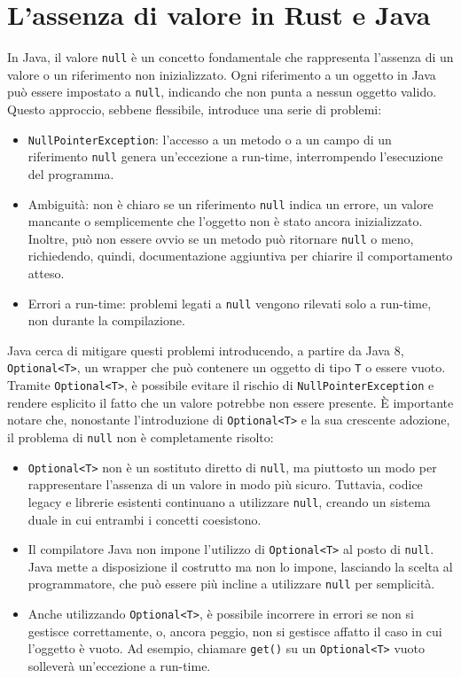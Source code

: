 \section{L'assenza di valore in Rust e Java}
In Java, il valore \texttt{null} è un concetto fondamentale che rappresenta l'assenza di un valore o un riferimento non inizializzato. Ogni riferimento a un oggetto in Java può essere impostato a \texttt{null}, indicando che non punta a nessun oggetto valido. Questo approccio, sebbene flessibile, introduce una serie di problemi: 
\begin{itemize}
    \item \texttt{NullPointerException}: l'accesso a un metodo o a un campo di un riferimento \texttt{null} genera un'eccezione a run-time, interrompendo l'esecuzione del programma. 
    \item Ambiguità: non è chiaro se un riferimento \texttt{null} indica un errore, un valore mancante o semplicemente che l'oggetto non è stato ancora inizializzato. Inoltre, può non essere ovvio se un metodo può ritornare \texttt{null} o meno, richiedendo, quindi, documentazione aggiuntiva per chiarire il comportamento atteso.
    \item Errori a run-time: problemi legati a \texttt{null} vengono rilevati solo a run-time, non durante la compilazione. 
\end{itemize}
Java cerca di mitigare questi problemi introducendo, a partire da Java 8, \texttt{Optional<T>}, un wrapper che può contenere un oggetto di tipo \texttt{T} o essere vuoto. Tramite \texttt{Optional<T>}, è possibile evitare il rischio di \texttt{NullPointerException} e rendere esplicito il fatto che un valore potrebbe non essere presente. È importante notare che, nonostante l'introduzione di \texttt{Optional<T>} e la sua crescente adozione, il problema di \texttt{null} non è completamente risolto:
\begin{itemize}
    \item \texttt{Optional<T>} non è un sostituto diretto di \texttt{null}, ma piuttosto un modo per rappresentare l'assenza di un valore in modo più sicuro. Tuttavia, codice legacy e librerie esistenti continuano a utilizzare \texttt{null}, creando un sistema duale in cui entrambi i concetti coesistono.
    \item Il compilatore Java non impone l'utilizzo di \texttt{Optional<T>} al posto di \texttt{null}. Java mette a disposizione il costrutto ma non lo impone, lasciando la scelta al programmatore, che può essere più incline a utilizzare \texttt{null} per semplicità.
    \item Anche utilizzando \texttt{Optional<T>}, è possibile incorrere in errori se non si gestisce correttamente, o, ancora peggio, non si gestisce affatto il caso in cui l'oggetto è vuoto. Ad esempio, chiamare \texttt{get()} su un \texttt{Optional<T>} vuoto solleverà un'eccezione a run-time. 
\end{itemize}
